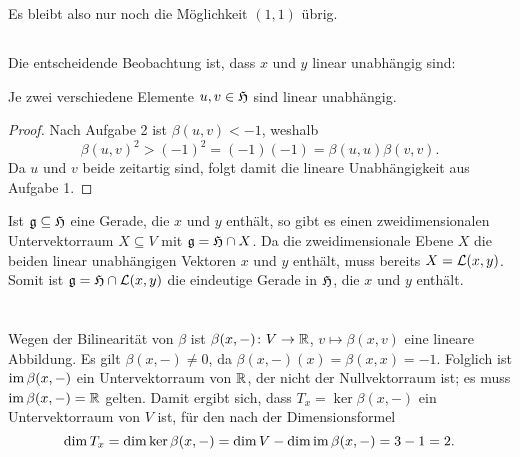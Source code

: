 \documentclass[a4paper,10pt,numbers=noenddot]{scrartcl}
\begin{document}
Es bleibt also nur noch die Möglichkeit $(1,1)$ übrig.





\subsection{}

Die entscheidende Beobachtung ist, dass $x$ und $y$ linear unabhängig sind:


\begin{lemma}\label{lem: elements of hyperbolic space are linear independent}
  Je zwei verschiedene Elemente $u, v \in \mathfrak{H}$ sind linear unabhängig.
\end{lemma}
\begin{proof}
Nach Aufgabe 2 ist $\beta(u,v) < -1$, weshalb
\[
    \beta(u,v)^2
  > (-1)^2
  = (-1)(-1)
  = \beta(u,u)\beta(v,v).
\]
Da $u$ und $v$ beide zeitartig sind, folgt damit die lineare Unabhängigkeit aus Aufgabe 1.
\end{proof}

Ist $\mathfrak{g} \subseteq \mathfrak{H}$ eine Gerade, die $x$ und $y$ enthält, so gibt es einen zweidimensionalen Untervektorraum $X \subseteq V$ mit $\mathfrak{g} = \mathfrak{H} \cap X$.
Da die zweidimensionale Ebene $X$ die beiden linear unabhängigen Vektoren $x$ und $y$ enthält, muss bereits $X = \operatorname{\mathcal{L}}(x,y)$.
Somit ist $\mathfrak{g} = \mathfrak{H} \cap \operatorname{\mathcal{L}}(x,y)$ die eindeutige Gerade in $\mathfrak{H}$, die $x$ und $y$ enthält.










\section{}





\subsection{}


Wegen der Bilinearität von $\beta$ ist $\beta(x, -) \colon V \to \mathbb{R}$, $v \mapsto \beta(x,v)$ eine lineare Abbildung.
Es gilt $\beta(x, -) \neq 0$, da $\beta(x,-)(x) = \beta(x,x) = -1$.
Folglich ist $\operatorname{im} \beta(x, -)$ ein Untervektorraum von $\mathbb{R}$, der nicht der Nullvektorraum ist; es muss $\operatorname{im} \beta(x, -) = \mathbb{R}$ gelten.
Damit ergibt sich, dass $T_x = \ker \beta(x, -)$ ein Untervektorraum von $V$ ist, für den nach der Dimensionsformel
\[
    \dim T_x
  = \dim \ker \beta(x,-)
  = \dim V - \dim \operatorname{im} \beta(x, -)
  = 3 - 1
  = 2.
\]
\end{document}

